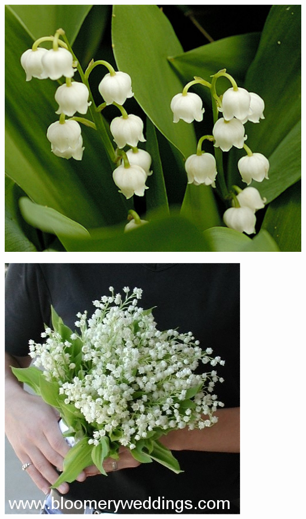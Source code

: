 \documentclass{article}
\begin{document}
\begin{center}
\includegraphics[height=0.9\textheight, angle=90]{../Lily-of-the-Valley.jpg}
\end{center}
\newpage

\begin{center}
\includegraphics[height=0.9\textheight, angle=90]{../Lily-of-the-Valley_Bouquet.jpg}
\end{center}
\newpage
\end{document}
